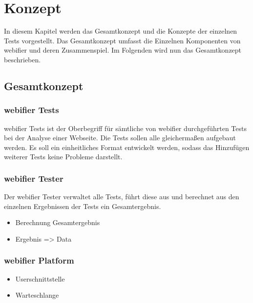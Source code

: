 \chapter{Konzept}

In diesem Kapitel werden das Gesamtkonzept und die Konzepte der einzelnen Tests vorgestellt. Das Gesamtkonzept umfasst die Einzelnen Komponenten von webifier und deren Zusammenspiel. Im Folgenden wird nun das Gesamtkonzept beschrieben.

\section{Gesamtkonzept}


\subsection{webifier Tests}

webifier Tests ist der Oberbegriff für sämtliche von webifier durchgeführten Tests bei der Analyse einer Webseite. Die Tests sollen alle gleichermaßen aufgebaut werden. Es soll ein einheitliches Format entwickelt werden, sodass das Hinzufügen weiterer Tests keine Probleme darstellt.

\subsection{webifier Tester}

Der webifier Tester verwaltet alle Tests, führt diese aus und berechnet aus den einzelnen Ergebnissen der Tests ein Gesamtergebnis.


\begin{itemize}
  \item Berechnung Gesamtergebnis
  \item Ergebnis => Data
\end{itemize}

\subsection{webifier Platform}


\begin{itemize}
  \item Userschnittstelle
  \item Warteschlange
\end{itemize}

